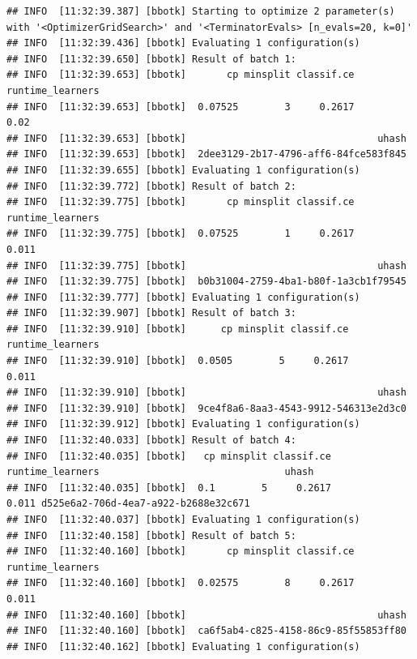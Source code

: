 \documentclass[
]{scrbook}
\newenvironment{Shaded}{\begin{snugshade}}{\end{snugshade}}
\newcommand{\FunctionTok}[1]{\textcolor[rgb]{0.00,0.00,0.00}{#1}}
\newcommand{\NormalTok}[1]{#1}
\newcommand{\SpecialCharTok}[1]{\textcolor[rgb]{0.00,0.00,0.00}{#1}}
\renewenvironment{Shaded} {\begin{snugshade}\small} {\end{snugshade}}
\begin{document}
\begin{Shaded}
\end{Shaded}

\begin{verbatim}
## INFO  [11:32:39.387] [bbotk] Starting to optimize 2 parameter(s) with '<OptimizerGridSearch>' and '<TerminatorEvals> [n_evals=20, k=0]' 
## INFO  [11:32:39.436] [bbotk] Evaluating 1 configuration(s) 
## INFO  [11:32:39.650] [bbotk] Result of batch 1: 
## INFO  [11:32:39.653] [bbotk]       cp minsplit classif.ce runtime_learners 
## INFO  [11:32:39.653] [bbotk]  0.07525        3     0.2617             0.02 
## INFO  [11:32:39.653] [bbotk]                                 uhash 
## INFO  [11:32:39.653] [bbotk]  2dee3129-2b17-4796-aff6-84fce583f845 
## INFO  [11:32:39.655] [bbotk] Evaluating 1 configuration(s) 
## INFO  [11:32:39.772] [bbotk] Result of batch 2: 
## INFO  [11:32:39.775] [bbotk]       cp minsplit classif.ce runtime_learners 
## INFO  [11:32:39.775] [bbotk]  0.07525        1     0.2617            0.011 
## INFO  [11:32:39.775] [bbotk]                                 uhash 
## INFO  [11:32:39.775] [bbotk]  b0b31004-2759-4ba1-b80f-1a3cb1f79545 
## INFO  [11:32:39.777] [bbotk] Evaluating 1 configuration(s) 
## INFO  [11:32:39.907] [bbotk] Result of batch 3: 
## INFO  [11:32:39.910] [bbotk]      cp minsplit classif.ce runtime_learners 
## INFO  [11:32:39.910] [bbotk]  0.0505        5     0.2617            0.011 
## INFO  [11:32:39.910] [bbotk]                                 uhash 
## INFO  [11:32:39.910] [bbotk]  9ce4f8a6-8aa3-4543-9912-546313e2d3c0 
## INFO  [11:32:39.912] [bbotk] Evaluating 1 configuration(s) 
## INFO  [11:32:40.033] [bbotk] Result of batch 4: 
## INFO  [11:32:40.035] [bbotk]   cp minsplit classif.ce runtime_learners                                uhash 
## INFO  [11:32:40.035] [bbotk]  0.1        5     0.2617            0.011 d525e6a2-706d-4ea7-a922-b2688e32c671 
## INFO  [11:32:40.037] [bbotk] Evaluating 1 configuration(s) 
## INFO  [11:32:40.158] [bbotk] Result of batch 5: 
## INFO  [11:32:40.160] [bbotk]       cp minsplit classif.ce runtime_learners 
## INFO  [11:32:40.160] [bbotk]  0.02575        8     0.2617            0.011 
## INFO  [11:32:40.160] [bbotk]                                 uhash 
## INFO  [11:32:40.160] [bbotk]  ca6f5ab4-c825-4158-86c9-85f55853ff80 
## INFO  [11:32:40.162] [bbotk] Evaluating 1 configuration(s) 

\end{verbatim}
\end{document}
